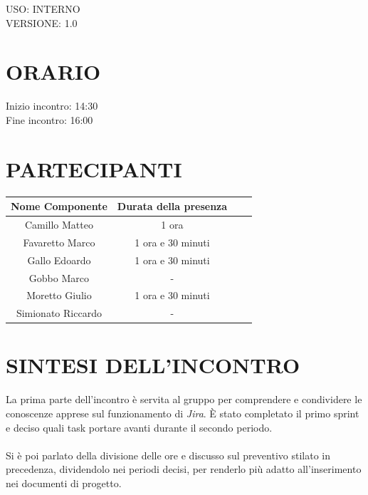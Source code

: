 \documentclass[5pt]{article}
\begin{document}
\begin{flushright}
    \begin{spacing}{1}
        USO: INTERNO\\
        VERSIONE: 1.0\\ %
    \end{spacing}
\end{flushright}


\restoregeometry

\pagebreak


\section{\Large ORARIO}
\begin{spacing}{1.5}
    {\large Inizio incontro: 14:30}\\
    {\large Fine incontro: 16:00}
\end{spacing}

\section{PARTECIPANTI}
\setlength\cellspacetoplimit{6pt}
\setlength\cellspacebottomlimit{6pt}

\begin{table}[ht]
  \begin{tabular}{|Sc|Sc|}
    \hline
    \textbf{Nome Componente} & \textbf{Durata della presenza} \\
    \hline
    Camillo Matteo & 1 ora \\
    Favaretto Marco & 1 ora e 30 minuti \\
    Gallo Edoardo & 1 ora e 30 minuti \\
    Gobbo Marco & - \\
    Moretto Giulio & 1 ora e 30 minuti \\
    Simionato Riccardo & - \\
    \hline
  \end{tabular}
  \label{tab:conference}
\end{table}

\section{SINTESI DELL'INCONTRO}
La prima parte dell'incontro è servita al gruppo per comprendere e condividere le conoscenze apprese sul funzionamento di \textit{Jira}. È stato completato il primo sprint e deciso quali task portare avanti durante il secondo periodo.\\
\\
Si è poi parlato della divisione delle ore e discusso sul preventivo stilato in precedenza, dividendolo nei periodi decisi, per renderlo più adatto all'inserimento nei documenti di progetto.
\end{document}
